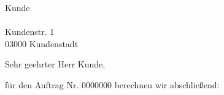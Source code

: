 \documentclass[backaddress=false,11pt,a4paper]{scrlttr2}
\begin{document}
\begin{letter}{Kunde\\
\ \\
Kundenstr. 1\\
03000  Kundenstadt}
\opening{Sehr geehrter Herr Kunde,}

für den Auftrag Nr. 0000000 berechnen wir abschließend:

\vspace{10pt}

\Euro{}
\Waehrung{\euro}

\begin{Rechnung}[N]

\end{Rechnung}

\end{letter}
\end{document}
